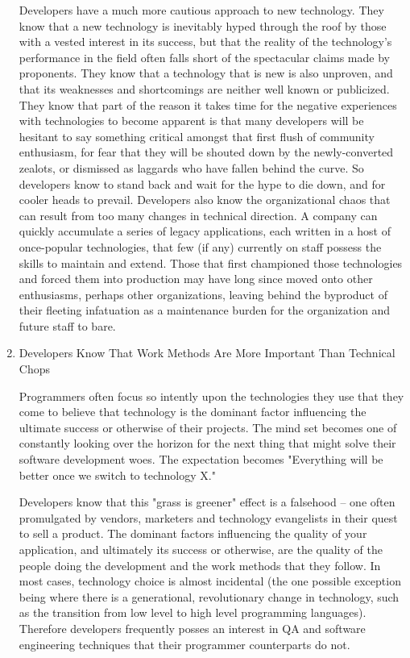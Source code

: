 \documentclass{article}
\begin{document}
\begin{enumerate}
Developers have a much more cautious approach to new technology. They
know that a new technology is inevitably hyped through the roof by those
with a vested interest in its success, but that the reality of the
technology's performance in the field often falls short of the
spectacular claims made by proponents. They know that a technology that
is new is also unproven, and that its weaknesses and shortcomings are
neither well known or publicized. They know that part of the reason it
takes time for the negative experiences with technologies to become
apparent is that many developers will be hesitant to say something
critical amongst that first flush of community enthusiasm, for fear that
they will be shouted down by the newly-converted zealots, or dismissed
as laggards who have fallen behind the curve. So developers know to
stand back and wait for the hype to die down, and for cooler heads to
prevail. Developers also know the organizational chaos that can result
from too many changes in technical direction. A company can quickly
accumulate a series of legacy applications, each written in a host of
once-popular technologies, that few (if any) currently on staff possess
the skills to maintain and extend. Those that first championed those
technologies and forced them into production may have long since moved
onto other enthusiasms, perhaps other organizations, leaving behind the
byproduct of their fleeting infatuation as a maintenance burden for the
organization and future staff to bare.

\item Developers Know That Work Methods Are More Important Than Technical
\label{sec:orgheadline127}
Chops

Programmers often focus so intently upon the technologies they use that
they come to believe that technology is the dominant factor influencing
the ultimate success or otherwise of their projects. The mind set
becomes one of constantly looking over the horizon for the next thing
that might solve their software development woes. The expectation
becomes "Everything will be better once we switch to technology X."

Developers know that this "grass is greener" effect is a falsehood --
one often promulgated by vendors, marketers and technology evangelists
in their quest to sell a product. The dominant factors influencing the
quality of your application, and ultimately its success or otherwise,
are the quality of the people doing the development and the work methods
that they follow. In most cases, technology choice is almost incidental
(the one possible exception being where there is a generational,
revolutionary change in technology, such as the transition from low
level to high level programming languages). Therefore developers
frequently posses an interest in QA and software engineering techniques
that their programmer counterparts do not.


\end{enumerate}
\end{document}
